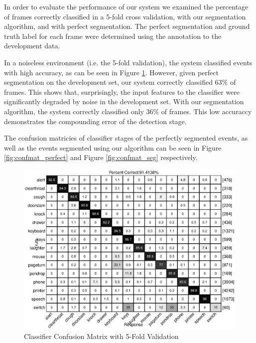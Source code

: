 In order to evaluate the performance of our system we examined the percentage of frames 
correctly classified in a 5-fold cross validation, with our segmentation algorithm, and with perfect segmentation. The perfect segmentation and ground truth label for each frame were determined using the annotation to the development data.

In a noiseless environment (i.e. the 5-fold validation), the system classified events with high accuracy, as can be seen in Figure \ref{fig:kfolds}. However, given perfect segmentation on the development set, our system correctly classified 63\% of frames. This shows that, surprisingly, the input features to the classifier were significantly degraded by noise in the development set. With our segmentation algorithm, the system correctly classified only 36\% of frames. This low accuraccy demonstrates the compounding error of the detection stage.

The confusion matricies of classifier stages of the perfectly segmented events, as well as the events segmented using our algorithm can be seen in Figure \ref{fig:confmat_perfect} and Figure \ref{fig:confmat_seg} respectively.

\begin{figure}[h]
  \centering
  \centerline{\includegraphics[width=\columnwidth]{kfolds}}
  \caption{Classifier Confusion Matrix with 5-Fold Validation}
  \label{fig:kfolds}
\end{figure}

